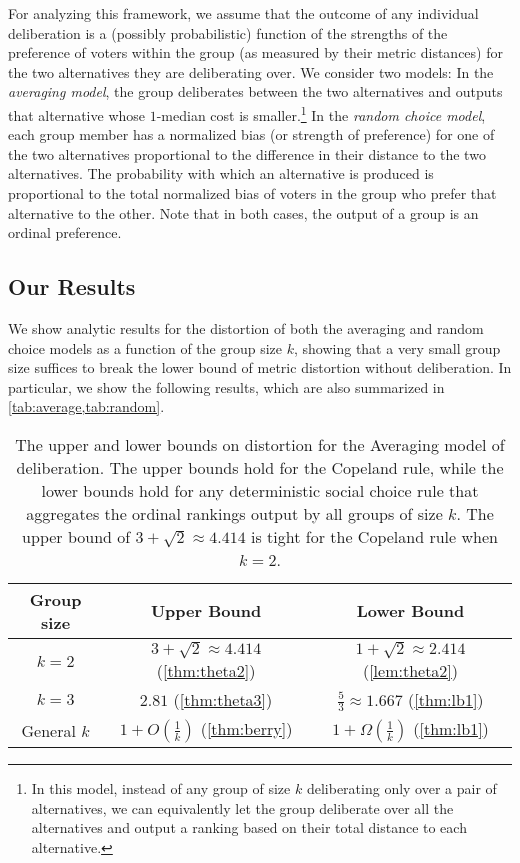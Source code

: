 For analyzing this framework, we assume that the outcome of any individual deliberation is a (possibly probabilistic) function of the strengths of the preference of voters within the group (as measured by their metric distances) for the two alternatives they are deliberating over. We consider two models: In the {\em averaging model}, the group deliberates between the two alternatives and outputs that alternative whose $1$-median cost is smaller.\footnote{In this model, instead of any group of size $k$ deliberating only over a pair of alternatives, we can equivalently let the group deliberate over all the alternatives and output a ranking based on their total distance to each alternative.}  In the {\em random choice model}, each group member has a normalized bias (or strength of preference) for one of the two alternatives proportional to the difference in their distance to the two alternatives. The probability with which an alternative is produced is proportional to the total normalized bias of voters in the group who prefer that alternative to the other. %
Note that in both cases, the output of a group is an ordinal preference. 


\subsection{Our Results} We show analytic results for the distortion of both the averaging and random choice models as a function of the group size $k$, showing that a very small group size suffices to break the lower bound of metric distortion without deliberation. In particular, we show the following results, which are also summarized in \cref{tab:average,tab:random}.

\begin{table}[htp]
	\centering
 
	\begin{tabular}{|c|c|c|}
		\toprule
        Group size & Upper Bound & Lower Bound \\
        \midrule 
        $k = 2$ & $3 + \sqrt{2} \approx 4.414$ (\cref{thm:theta2}) & $1 + \sqrt{2} \approx 2.414$ (\cref{lem:theta2})  \\
        \midrule
        $k = 3$ & $2.81$ (\cref{thm:theta3}) & $\frac{5}{3} \approx 1.667$ (\cref{thm:lb1})  \\
           \midrule
        General $k$ & $1 + O\left(\frac{1}{k}\right)$ (\cref{thm:berry}) & $1 + \Omega\left(\frac{1}{k}\right)$ (\cref{thm:lb1}) \\
      \bottomrule
	\end{tabular}
	\caption{\label{tab:average} The upper and lower bounds on distortion for the Averaging model of deliberation. The upper bounds hold for the Copeland rule, while the lower bounds hold for any deterministic social choice rule that aggregates the ordinal rankings output by all groups of size $k$.  The upper bound of $3 + \sqrt{2} \approx 4.414$ is tight for the Copeland rule  when $k=2$. 
    }
\end{table}

